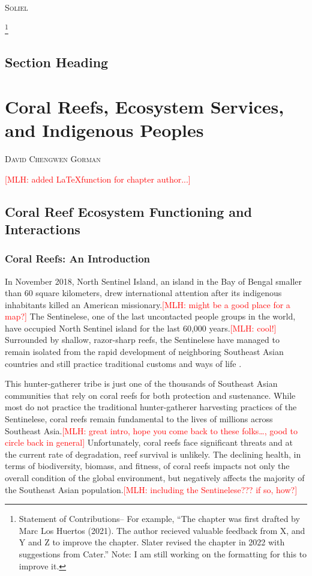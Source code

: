 \documentclass{book}\usepackage{knitr}
\makeatletter
\newcommand{\red}[1]{\textcolor{red}{[MLH: #1]}}
\newcommand{\chapterauthor}[1]{%
  {\parindent0pt\vspace*{-25pt}%
  \linespread{1.1}\large\scshape#1%
  \par\nobreak\vspace*{35pt}}
  \@afterheading%
}
\makeatother
\begin{document}
{\chapterauthor{Soliel}

\footnote{Statement of Contributions-- For example, ``The chapter was first drafted by Marc Los Huertos (2021). The author recieved valuable feedback from X, and Y and Z to improve the chapter. Slater revised the chapter in 2022 with suggestions from Cater.'' Note: I am still working on the formatting for this to improve it.}

\section{Section Heading}%



\chapter{Coral Reefs, Ecosystem Services, and Indigenous Peoples}

\chapterauthor{David Chengwen Gorman} \red{added \LaTeX function  for chapter author...}

\section{Coral Reef Ecosystem Functioning and Interactions}

\subsection{Coral Reefs: An Introduction}

In November 2018, North Sentinel Island, an island in the Bay of Bengal smaller than 60 square kilometers, drew international attention after its indigenous inhabitants killed an American missionary.\red{might be a good place for a map?} The Sentinelese, one of the last uncontacted people groups in the world, have occupied North Sentinel island for the last 60,000 years.\red{cool!} Surrounded by shallow, razor-sharp reefs, the Sentinelese have managed to remain isolated from the rapid development of neighboring Southeast Asian countries and still practice traditional customs and ways of life \citep{Smith}.

This hunter-gatherer tribe is just one of the thousands of Southeast Asian communities that rely on coral reefs for both protection and sustenance. While most do not practice the traditional hunter-gatherer harvesting practices of the Sentinelese, coral reefs remain fundamental to the lives of millions across Southeast Asia.\red{great intro, hope you come back to these folks\ldots, good to circle back in general} Unfortunately, coral reefs face significant threats and at the current rate of degradation, reef survival is unlikely. The declining health, in terms of biodiversity, biomass, and fitness, of coral reefs impacts not only the overall condition of the global environment, but negatively affects the majority of the Southeast Asian population.\red{including the Sentinelese??? if so, how?}

}
\end{document}
